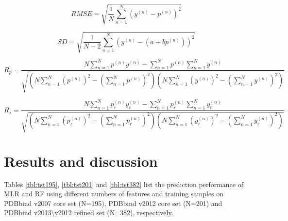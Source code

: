 \documentclass[journal=jacsat,manuscript=article]{achemso}
\begin{document}
\begin{equation}
RMSE = \sqrt{\frac{1}{N}\sum_{n=1}^N(y^{(n)}-p^{(n)})^2}
\label{eqn:rmse}
\end{equation}

\begin{equation}
SD = \sqrt{\frac{1}{N-2}\sum_{n=1}^N(y^{(n)}-(a+bp^{(n)}))^2}
\label{eqn:sd}
\end{equation}

\begin{equation}
R_p = \frac{N\sum_{n=1}^Np^{(n)}y^{(n)}-\sum_{n=1}^Np^{(n)}\sum_{n=1}^Ny^{(n)}}{\sqrt{(N\sum_{n=1}^N(p^{(n)})^2-(\sum_{n=1}^Np^{(n)})^2)(N\sum_{n=1}^N(y^{(n)})^2-(\sum_{n=1}^Ny^{(n)})^2)}}
\label{eqn:rp}
\end{equation}

\begin{equation}
R_s = \frac{N\sum_{n=1}^Np_r^{(n)}y_r^{(n)}-\sum_{n=1}^Np_r^{(n)}\sum_{n=1}^Ny_r^{(n)}}{\sqrt{(N\sum_{n=1}^N(p_r^{(n)})^2-(\sum_{n=1}^Np_r^{(n)})^2)(N\sum_{n=1}^N(y_r^{(n)})^2-(\sum_{n=1}^Ny_r^{(n)})^2)}}
\label{eqn:rs}
\end{equation}

\section{Results and discussion}

Tables \ref{tbl:tst195}, \ref{tbl:tst201} and \ref{tbl:tst382} list the prediction performance of MLR and RF using different numbers of features and training samples on PDBbind v2007 core set (N=195), PDBbind v2012 core set (N=201) and PDBbind v2013\textbackslash v2012 refined set (N=382), respectively.
\end{document}

